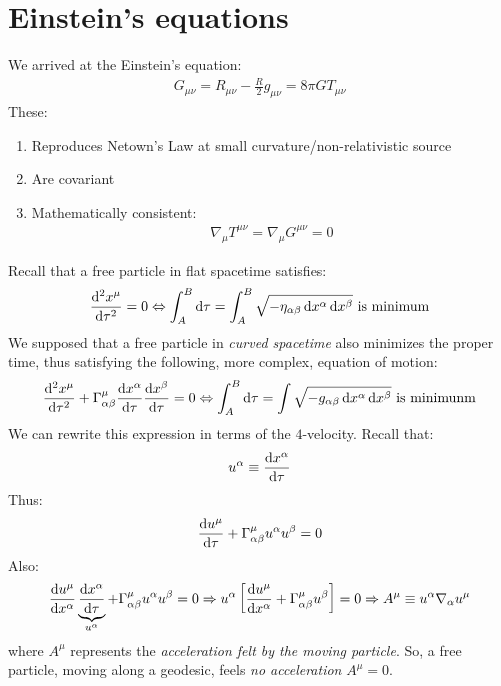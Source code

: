 \documentclass[../template.tex]{subfiles}
\begin{document}
\section{Einstein's equations}
We arrived at the Einstein's equation:
\begin{align*}
    G_{\mu \nu } = R_{\mu \nu} - \frac{R}{2} g_{\mu \nu} = 8 \pi G T_{\mu \nu} 
\end{align*}
These:
\begin{enumerate}
    \item Reproduces Netown's Law at small curvature/non-relativistic source
    \item Are covariant
    \item Mathematically consistent:
    \begin{align*}
        \nabla_\mu T^{\mu \nu} = \nabla_\mu G^{\mu \nu} = 0
    \end{align*}
\end{enumerate}

Recall that a free particle in flat spacetime satisfies:
\begin{align*}
    \dv[2]{x^\mu}{\tau} = 0 \Leftrightarrow \int_A^B \dd{\tau} = \int_A^B \sqrt{- \eta_{\alpha \beta} \dd{x^\alpha} \dd{x^\beta}} \text{ is minimum}
\end{align*}
We supposed that a free particle in \textit{curved spacetime} also minimizes the proper time, thus satisfying the following, more complex, equation of motion:
\begin{align*}
    \dv[2]{x^\mu}{\tau} + \Gamma^\mu_{\alpha \beta} \dv{x^\alpha}{\tau} \dv{x^\beta}{\tau} = 0 \Leftrightarrow \int_A^B \dd{\tau} = \int\sqrt{-g_{\alpha \beta} \dd{x^\alpha} \dd{x^\beta}} \text{ is minimunm}
\end{align*}
We can rewrite this expression in terms of the $4$-velocity. Recall that:
\begin{align*}
    u^\alpha \equiv \dv{x^\alpha}{\tau}
\end{align*}  
Thus:
\begin{align*}
    \dv{u^\mu}{\tau} + \Gamma^\mu_{\alpha \beta} u^\alpha u^\beta = 0
\end{align*}
Also:
\begin{align*}
    \dv{u^\mu}{x^\alpha} \underbrace{\dv{x^\alpha}{\tau}}_{u^\alpha} + \Gamma^\mu_{\alpha \beta} u^\alpha u^\beta = 0 \Rightarrow u^\alpha \left[ \dv{u^\mu}{x^\alpha} + \Gamma^\mu_{\alpha \beta} u^\beta\right] = 0 \Rightarrow A^\mu \equiv u^\alpha \nabla_\alpha u^\mu 
\end{align*}
where $A^\mu$ represents the \textit{acceleration felt by the moving particle}. So, a free particle, moving along a geodesic, feels \textit{no acceleration} $A^\mu = 0$.
\end{document}
